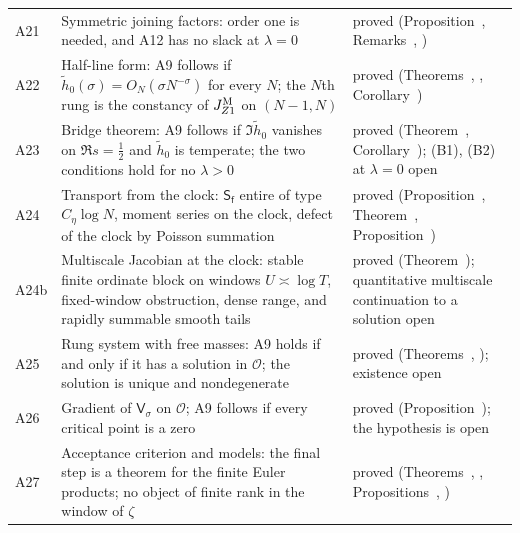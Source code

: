 \documentclass[11pt,reqno]{amsart}
\makeatletter
\let\CG@origref\ref
\newcommand{\CG@gettip}[1]{\@ifundefined{CGTip@#1}{Reference: #1}{\csname CGTip@#1\endcsname}}
\DeclareRobustCommand{\CGref}[1]{\pdftooltip{\CG@origref{#1}}{\CG@gettip{#1}}}
\numberwithin{equation}{section}
\theoremstyle{plain}
\theoremstyle{definition}
\theoremstyle{remark}
\makeatother
\begin{document}
\begin{longtable}{p{}p{}p{}}
A21 & Symmetric joining factors: order one is needed, and A12 has no slack at $\lambda=0$ & proved (Proposition~\CGref{prop:dichotomy}, Remarks~\CGref{rem:pair-no-slack}, \CGref{rem:dichotomy-counterexample})\\
A22 & Half-line form: A9 follows if $\tilde h_0(\sigma)=O_N(\sigma N^{-\sigma})$ for every $N$; the $N$th rung is the constancy of $J^{\rm M}_{Z1}$ on $(N-1,N)$ & proved (Theorems~\CGref{thm:ladder}, \CGref{thm:halfline-hamburger}, Corollary~\CGref{cor:ladder-pair})\\
A23 & Bridge theorem: A9 follows if $\Im\tilde h_0$ vanishes on $\Re s=\frac12$ and $\tilde h_0$ is temperate; the two conditions hold for no $\lambda>0$ & proved (Theorem~\CGref{thm:bridge}, Corollary~\CGref{cor:bridge-family}); \textup{(B1)}, \textup{(B2)} at $\lambda=0$ open\\
A24 & Transport from the clock: $\mathsf S_{\mathsf f}$ entire of type $C_\eta\log N$, moment series on the clock, defect of the clock by Poisson summation & proved (Proposition~\CGref{prop:rung-functional}, Theorem~\CGref{thm:transport-band}, Proposition~\CGref{prop:clock-defect-poisson})\\
A24b & Multiscale Jacobian at the clock: stable finite ordinate block on windows $U\asymp\log T$, fixed-window obstruction, dense range, and rapidly summable smooth tails & proved (Theorem~\CGref{thm:clock-jacobian}); quantitative multiscale continuation to a solution open\\
A25 & Rung system with free masses: A9 holds if and only if it has a solution in $\mathscr O$; the solution is unique and nondegenerate & proved (Theorems~\CGref{thm:free-masses}, \CGref{thm:nondegenerate}); existence open\\
A26 & Gradient of $\mathsf V_\sigma$ on $\mathscr O$; A9 follows if every critical point is a zero & proved (Proposition~\CGref{prop:critical-points}); the hypothesis is open\\
A27 & Acceptance criterion and models: the final step is a theorem for the finite Euler products; no object of finite rank in the window of $\zeta$ & proved (Theorems~\CGref{thm:acceptance}, \CGref{thm:finite-euler}, Propositions~\CGref{prop:graph-model}, \CGref{prop:no-finite-rank})\\
\end{longtable}
\endgroup
\end{document}
